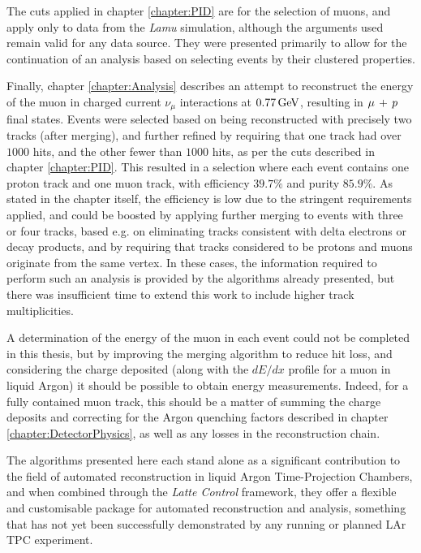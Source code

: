 The cuts applied in chapter \ref{chapter:PID} are for the selection of muons, and apply only to data from the \emph{Lamu} simulation, although the arguments used remain valid for any data source. They were presented primarily to allow for the continuation of an analysis based on selecting events by their clustered properties.

Finally, chapter \ref{chapter:Analysis} describes an attempt to reconstruct the energy of the muon in charged current $\nu_\mu$ interactions at $0.77\,\mathrm{GeV}$, resulting in $\mu\,+\,p$ final states. Events were selected based on being reconstructed with precisely two tracks (after merging), and further refined by requiring that one track had over $1000$ hits, and the other fewer than $1000$ hits, as per the cuts described in chapter \ref{chapter:PID}. This resulted in a selection where each event contains one proton track and one muon track, with efficiency $39.7\%$ and purity $85.9\%$. As stated in the chapter itself, the efficiency is low due to the stringent requirements applied, and could be boosted by applying further merging to events with three or four tracks, based e.g. on eliminating tracks consistent with delta electrons or decay products, and by requiring that tracks considered to be protons and muons originate from the same vertex. In these cases, the information required to perform such an analysis is provided by the algorithms already presented, but there was insufficient time to extend this work to include higher track multiplicities.

A determination of the energy of the muon in each event could not be completed in this thesis, but by improving the merging algorithm to reduce hit loss, and considering the charge deposited (along with the $dE/dx$ profile for a muon in liquid Argon) it should be possible to obtain energy measurements. Indeed, for a fully contained muon track, this should be a matter of summing the charge deposits and correcting for the Argon quenching factors described in chapter \ref{chapter:DetectorPhysics}, as well as any losses in the reconstruction chain.

The algorithms presented here each stand alone as a significant contribution to the field of automated reconstruction in liquid Argon Time-Projection Chambers, and when combined through the \emph{Latte Control} framework, they offer a flexible and customisable package for automated reconstruction and analysis, something that has not yet been successfully demonstrated by any running or planned \ac{LAr TPC} experiment.
